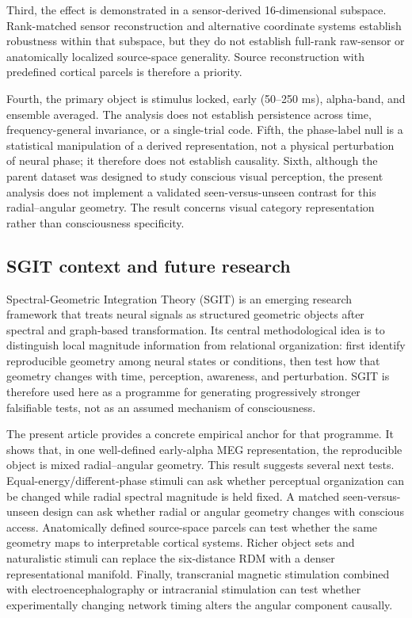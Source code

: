\documentclass[11pt]{article}
\begin{document}
Third, the effect is demonstrated in a sensor-derived 16-dimensional subspace. Rank-matched sensor reconstruction and alternative coordinate systems establish robustness within that subspace, but they do not establish full-rank raw-sensor or anatomically localized source-space generality. Source reconstruction with predefined cortical parcels is therefore a priority.

Fourth, the primary object is stimulus locked, early (50--250 ms), alpha-band, and ensemble averaged. The analysis does not establish persistence across time, frequency-general invariance, or a single-trial code. Fifth, the phase-label null is a statistical manipulation of a derived representation, not a physical perturbation of neural phase; it therefore does not establish causality. Sixth, although the parent dataset was designed to study conscious visual perception, the present analysis does not implement a validated seen-versus-unseen contrast for this radial--angular geometry. The result concerns visual category representation rather than consciousness specificity.

\subsection{SGIT context and future research}
Spectral-Geometric Integration Theory (SGIT) is an emerging research framework that treats neural signals as structured geometric objects after spectral and graph-based transformation. Its central methodological idea is to distinguish local magnitude information from relational organization: first identify reproducible geometry among neural states or conditions, then test how that geometry changes with time, perception, awareness, and perturbation. SGIT is therefore used here as a programme for generating progressively stronger falsifiable tests, not as an assumed mechanism of consciousness.

The present article provides a concrete empirical anchor for that programme. It shows that, in one well-defined early-alpha MEG representation, the reproducible object is mixed radial--angular geometry. This result suggests several next tests. Equal-energy/different-phase stimuli can ask whether perceptual organization can be changed while radial spectral magnitude is held fixed. A matched seen-versus-unseen design can ask whether radial or angular geometry changes with conscious access. Anatomically defined source-space parcels can test whether the same geometry maps to interpretable cortical systems. Richer object sets and naturalistic stimuli can replace the six-distance RDM with a denser representational manifold. Finally, transcranial magnetic stimulation combined with electroencephalography or intracranial stimulation can test whether experimentally changing network timing alters the angular component causally.
\end{document}
